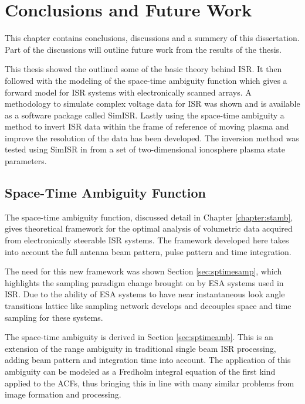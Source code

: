 \chapter{Conclusions and Future Work}
\label{chapter:Conclusions}
\thispagestyle{myheadings}

\graphicspath{{6_Conclusion/Figures/}}
This chapter contains conclusions, discussions and a summery of this dissertation. Part of the discussions will outline future work from the results of the thesis.

This thesis showed the outlined some of the basic theory behind ISR. It then followed with the modeling of the space-time ambiguity function which gives a forward model for ISR systems with electronically scanned arrays. A methodology to simulate complex voltage data for ISR was shown and is available as a software package called SimISR. Lastly using the space-time ambiguity a method to invert ISR data within the frame of reference of moving plasma and improve the resolution of the data has been developed. The inversion method was tested using SimISR in from a set of two-dimensional ionosphere plasma state parameters.

\section{Space-Time Ambiguity Function}
The space-time ambiguity function, discussed detail in Chapter \ref{chapter:stamb}, gives theoretical framework for the optimal analysis of volumetric data acquired from electronically steerable ISR systems. The framework developed here takes into account the full antenna beam pattern, pulse pattern and time integration.

The need for this new framework was shown Section \ref{sec:sptimesamp}, which highlights the sampling paradigm change brought on by ESA systems used in ISR. Due to the ability of ESA systems to have near instantaneous look angle transitions lattice like sampling network develops and decouples space and time sampling for these systems.

The space-time ambiguity is derived in Section \ref{sec:sptimeamb}. This is an extension of the range ambiguity in traditional single beam ISR processing, adding beam pattern and integration time into account. The application of this ambiguity can be modeled as a Fredholm integral equation of the first kind applied to the ACFs, thus bringing this in line with many similar problems from image formation and processing.

